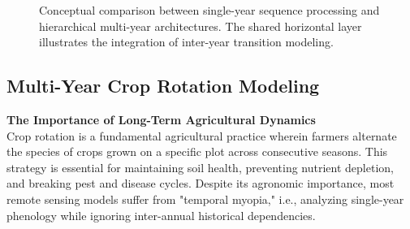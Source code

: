 \begin{figure}[htpb]
    \caption{Conceptual comparison between single-year sequence processing and hierarchical multi-year architectures.
        The shared horizontal layer illustrates the integration of inter-year transition modeling.}
    \label{fig:paradigm_shift}
\end{figure}

\subsection{Multi-Year Crop Rotation Modeling}
\label{subsec:crop_rotation}

\textbf{The Importance of Long-Term Agricultural Dynamics} \\
Crop rotation is a fundamental agricultural practice wherein farmers alternate the species of crops grown on a specific plot across consecutive seasons.
This strategy is essential for maintaining soil health, preventing nutrient depletion, and breaking pest and disease cycles.
Despite its agronomic importance, most remote sensing models suffer from "temporal myopia,"
i.e., analyzing single-year phenology while ignoring inter-annual historical dependencies.

